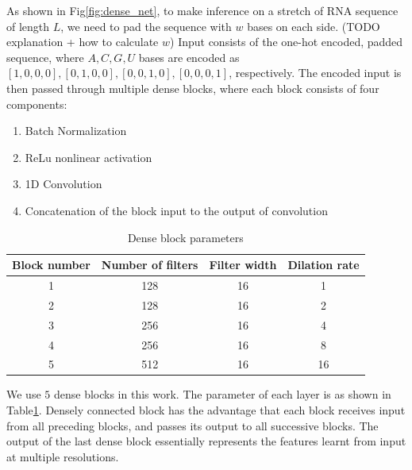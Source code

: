 \documentclass{proposal}
\begin{document}
As shown in Fig\ref{fig:dense_net}, to make inference on a stretch of RNA sequence of length $L$,
we need to pad the sequence with $w$ bases on each side. (TODO explanation + how to calculate $w$)
Input consists of the one-hot encoded, padded sequence,
where $A, C, G, U$ bases are encoded as $[1, 0, 0, 0], [0, 1, 0, 0], [0, 0, 1, 0], [0, 0, 0, 1]$, respectively.
The encoded input is then passed through multiple dense blocks,
where each block consists of four components:

\begin{enumerate}
    \item Batch Normalization
    \item ReLu nonlinear activation
    \item 1D Convolution
    \item Concatenation of the block input to the output of convolution
\end{enumerate}


\begin{table}[h!]
    \centering
    \begin{tabular}{||c c c c||}
        \hline
        Block number & Number of filters & Filter width & Dilation rate \\ [0.5ex]
        \hline\hline
        1 & 128 & 16 & 1 \\
        \hline
        2 & 128 & 16 & 2 \\
        \hline
        3 & 256 & 16 & 4 \\
        \hline
        4 & 256 & 16 & 8 \\
        \hline
        5 & 512 & 16 & 16 \\ [1ex]
        \hline
    \end{tabular}
    \caption{Dense block parameters}
    \label{table:conv_layer_params}
\end{table}

We use $5$ dense blocks in this work. The parameter of each layer is as shown in Table\ref{table:conv_layer_params}.
Densely connected block has the advantage that each block receives input from all preceding blocks,
and passes its output to all successive blocks.
The output of the last dense block essentially represents the features learnt from input at multiple resolutions.
\end{document}
